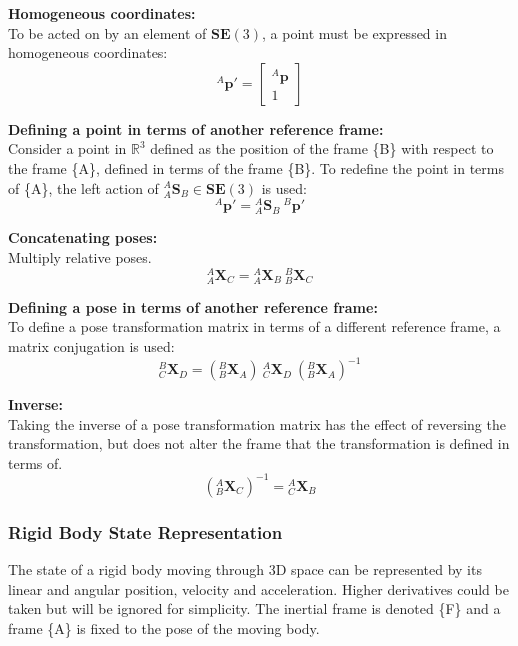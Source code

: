 		\textbf{Homogeneous coordinates:}\\
		To be acted on by an element of $\mathbf{SE}(3)$, a point must be expressed in homogeneous coordinates:
		\begin{equation}
			^{A}\mathbf{p'} = 
			\begin{bmatrix}
				^{A}\mathbf{p} \\
				1
			\end{bmatrix}
		\end{equation}
		
		\textbf{Defining a point in terms of another reference frame:}\\
		Consider a point in $\mathbb{R}^3$ defined as the position of the frame \{B\} with respect to the frame \{A\}, defined in terms of the frame \{B\}. To redefine the point in terms of \{A\}, the left action of ${^{A}_{A}\mathbf{S}^{}_{B}} \in \mathbf{SE}(3)$ is used:
		\begin{equation}
			^{A}\mathbf{p'} = {^{A}_{A}\mathbf{S}^{}_{B}}\:^{B}\mathbf{p'}
		\end{equation}
		
		\textbf{Concatenating poses:}\\
		Multiply relative poses.
		\begin{equation}
			{^{A}_{A}\mathbf{X}^{}_{C}} = {^{A}_{A}\mathbf{X}^{}_{B}}\:{^{B}_{B}\mathbf{X}^{}_{C}}
		\end{equation}
		
		\textbf{Defining a pose in terms of another reference frame:}\\
		To define a pose transformation matrix in terms of a different reference frame, a matrix conjugation is used:
		\begin{equation}
			{^{B}_{C}\mathbf{X}^{}_{D}} = ({^{B}_{B}\mathbf{X}^{}_{A}})\:{^{A}_{C}\mathbf{X}^{}_{D}}\:({^{B}_{B}\mathbf{X}^{}_{A}})^{-1}
		\end{equation}

		\textbf{Inverse:}\\
		Taking the inverse of a pose transformation matrix has the effect of reversing the transformation, but does not alter the frame that the transformation is defined in terms of.
		\begin{equation}
			({^{A}_{B}\mathbf{X}^{}_{C}})^{-1} = {^{A}_{C}\mathbf{X}^{}_{B}}
		\end{equation}
	
	\subsubsection{Rigid Body State Representation} \label{state rep}
		The state of a rigid body moving through 3D space can be represented by its linear and angular position, velocity and acceleration. Higher derivatives could be taken but will be ignored for simplicity.
		The inertial frame is denoted \{F\} and a frame \{A\} is fixed to the pose of the moving body.
		
